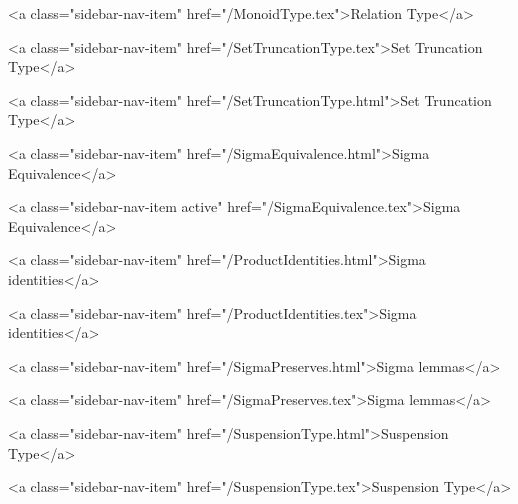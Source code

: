       
    
      
        
          <a class="sidebar-nav-item" href="/MonoidType.tex">Relation Type</a>
        
      
    
      
        
          <a class="sidebar-nav-item" href="/SetTruncationType.tex">Set Truncation Type</a>
        
      
    
      
        
          <a class="sidebar-nav-item" href="/SetTruncationType.html">Set Truncation Type</a>
        
      
    
      
        
          <a class="sidebar-nav-item" href="/SigmaEquivalence.html">Sigma Equivalence</a>
        
      
    
      
        
          <a class="sidebar-nav-item active" href="/SigmaEquivalence.tex">Sigma Equivalence</a>
        
      
    
      
        
          <a class="sidebar-nav-item" href="/ProductIdentities.html">Sigma identities</a>
        
      
    
      
        
          <a class="sidebar-nav-item" href="/ProductIdentities.tex">Sigma identities</a>
        
      
    
      
        
          <a class="sidebar-nav-item" href="/SigmaPreserves.html">Sigma lemmas</a>
        
      
    
      
        
          <a class="sidebar-nav-item" href="/SigmaPreserves.tex">Sigma lemmas</a>
        
      
    
      
        
          <a class="sidebar-nav-item" href="/SuspensionType.html">Suspension Type</a>
        
      
    
      
        
          <a class="sidebar-nav-item" href="/SuspensionType.tex">Suspension Type</a>
        
